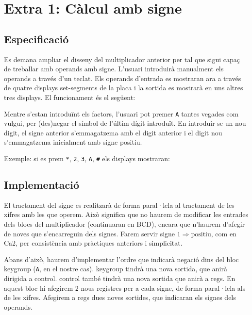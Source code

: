 \chapter{Extra 1: Càlcul amb signe}

\section{Especificació}

Es demana ampliar el disseny del multiplicador anterior per tal que sigui capaç de treballar amb operands amb signe. L'usuari introduirà manualment els operands a través d'un teclat. Els operands d'entrada es mostraran ara a través de quatre displays set-segments de la placa i la sortida es mostrarà en uns altres tres displays. El funcionament és el següent:

Mentre s'estan introduïnt els factors, l'usuari pot premer \texttt{A} tantes vegades com vulgui, per (des)negar el símbol de l'últim dígit introduït. En introduir-se un nou digit, el signe anterior s'emmagatzema amb el digit anterior i el digit nou s'emmagatzema inicialment amb signe positiu.

Exemple: si es prem \texttt{*}, \texttt{2}, \texttt{3}, \texttt{A}, \texttt{\#} els displays mostraran:

\begin{center}
\sevenseg{-}\sevenseg{ }\sevenseg{ }\sevenseg{-}
\end{center}

\section{Implementació}

El tractament del signe es realitzarà de forma paral·lela al tractament de les xifres amb les que operem. Això significa que no haurem de modificar les entrades dels blocs del multiplicador (continuaran en BCD), encara que n'haurem d'afegir de noves que s'encarreguin dels signes. Farem servir signe $1 \Rightarrow \text{positiu}$, com en Ca2, per consistència amb pràctiques anteriors i simplicitat.

Abans d'això, haurem d'implementar l'ordre que indicarà negació dins del bloc keygroup (\texttt{A}, en el nostre cas). \textsf{keygroup} tindrà una nova sortida, que anirà dirigida a \textsf{control}. \textsf{control} també tindrà una nova sortida que anirà a \textsf{regs}. En aquest bloc hi afegirem 2 nous registres per a cada signe, de forma paral·lela als de les xifres. Afegirem a \textsf{regs} dues noves sortides, que indicaran els signes dels operands.

